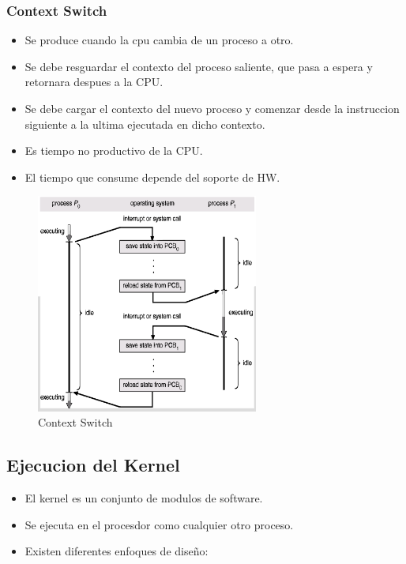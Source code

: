 \subsubsection{Context Switch}
\begin{itemize}
    \item Se produce cuando la cpu cambia de un proceso a otro.
    \item Se debe resguardar el contexto del proceso saliente, que pasa a espera y retornara despues a la CPU.
    \item Se debe cargar el contexto del nuevo proceso y comenzar desde la instruccion siguiente a la ultima ejecutada en dicho contexto.
    \item Es tiempo no productivo de la CPU.
    \item El tiempo que consume depende del soporte de HW.
\end{itemize}
\begin{figure}[ht]
    \begin{center}
        \includegraphics[width=0.65\textwidth]{assets/ContextSwitch.eps}
    \end{center}
    \caption{Context Switch}\label{fig:}
\end{figure}

\subsection{Ejecucion del Kernel}
\begin{itemize}
    \item El kernel es un conjunto de modulos de software.
    \item Se ejecuta en el procesdor como cualquier otro proceso.
    \item Existen diferentes enfoques de diseño:
\end{itemize}
